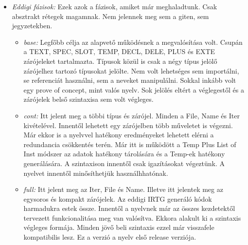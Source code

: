 {\begin{itemize}
\item \emph{Eddigi fázisok:}
Ezek azok a fázisok, amiket már meghaladtunk.
Csak absztrakt rétegek magamnak.
Nem jelennek meg sem a giten, sem jegyzetekben.
\begin{itemize}
\item \emph{base:}
Legfőbb célja az alapvető működésnek a megvalósítása volt. 
Csupán a TEXT, SPEC, SLOT, TEMP, DECL, DELE, PLUS és EXTE zárójeleket tartalmazta.
Típusok közül is csak a négy típus jelölő zárójelhez tartozó típusokat jelölte.
Nem volt lehetséges sem importálni, se referenciát használni, sem a neveket manipulálni.
Sokkal inkább volt egy prove of concept, mint valós nyelv. 
Sok jelölés eltért a véglegestől és a zárójelek belső szintaxisa sem volt végleges.
\item \emph{cont:}
Itt jelent meg a többi típus és zárójel.
Minden a File, Name és Iter kivételével.
Innentől lehetett egy zárójelben több műveletet is végezni.
Már ekkor is a nyelvvel hatékony eredményeket lehetett elérni a redundancia csökkentés terén.
Már itt is működött a Temp Plus List of Inst módszer az adatok hatékony tárolására és a Temp-ek
hatékony generálására.
A szintaxison innentől csak igazításokat végeztünk.
A nyelvet innentől minősíthetjük használhhatónak.
\item \emph{full:}
Itt jelent meg az Iter, File és Name.
Illetve itt jelentek meg az egysoros és kompakt zárójelek.
Az eddigi IRTG generáló kódok harmadukra estek össze.
Innentől a nyelvnek már az összes kezdetektől tervezett funkcionalitása meg van valósítva.
Ekkora alakult ki a szintaxis végleges formája.
Minden jövő beli szintaxis ezzel már visszafele kompatibilis lesz.
Ez a verzió a nyelv első release verziója.
\end{itemize}


\end{itemize}}
